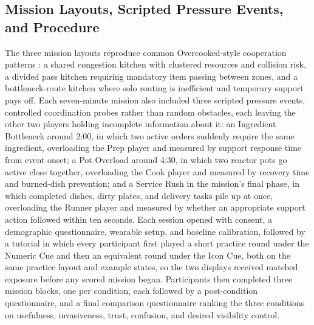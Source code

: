 \documentclass[manuscript,review,anonymous]{acmart}
\begin{document}
\subsection{Mission Layouts, Scripted Pressure Events, and Procedure}
The three mission layouts reproduce common Overcooked-style cooperation patterns \cite{carroll_utility_2019, baek_toward_2022, bishop_chaopt_2020}: a shared congestion kitchen with clustered resources and collision risk, a divided pass kitchen requiring mandatory item passing between zones, and a bottleneck-route kitchen where solo routing is inefficient and temporary support pays off. Each seven-minute mission also included three scripted pressure events, controlled coordination probes rather than random obstacles, each leaving the other two players holding incomplete information about it: an Ingredient Bottleneck around 2:00, in which two active orders suddenly require the same ingredient, overloading the Prep player and measured by support response time from event onset; a Pot Overload around 4:30, in which two reactor pots go active close together, overloading the Cook player and measured by recovery time and burned-dish prevention; and a Service Rush in the mission's final phase, in which completed dishes, dirty plates, and delivery tasks pile up at once, overloading the Runner player and measured by whether an appropriate support action followed within ten seconds. Each session opened with consent, a demographic questionnaire, wearable setup, and baseline calibration, followed by a tutorial in which every participant first played a short practice round under the Numeric Cue and then an equivalent round under the Icon Cue, both on the same practice layout and example states, so the two displays received matched exposure before any scored mission began. Participants then completed three mission blocks, one per condition, each followed by a post-condition questionnaire, and a final comparison questionnaire ranking the three conditions on usefulness, invasiveness, trust, confusion, and desired visibility control.
\end{document}
